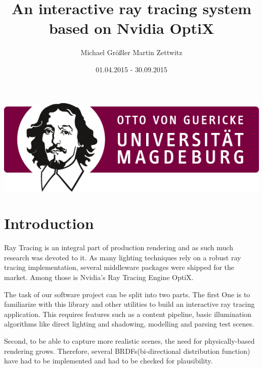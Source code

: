 \documentclass[11pt,a4paper]{article}
\begin{document}
	
\begin{titlepage}
\title{An interactive ray tracing system
\\based on Nvidia OptiX}
\date{01.04.2015 - 30.09.2015}
\author{Michael Größler	 Martin Zettwitz}
\maketitle

\begin{center}
\includegraphics[width=0.7\linewidth]{./OVGU}
\end{center}




\end{titlepage}

\tableofcontents


\newpage
\section{Introduction}
\label{sec:Introduction}
Ray Tracing is an integral part of production rendering and as such much research was devoted to it. As many lighting techniques rely on a robust ray tracing implementation, several middleware packages were shipped for the market. Among those is Nvidia's Ray Tracing Engine OptiX.

The task of our software project can be split into two parts. The first One is to familiarize with this library and other utilities to build an interactive ray tracing application. This requires features such as a content pipeline, basic illumination algorithms like direct lighting and shadowing, modelling and parsing test scenes.

Second, to be able to capture more realistic scenes, the need for physically-based rendering grows. Therefore, several BRDFs(bi-directional distribution function) have had to be implemented and had to be checked for plausibility.

\newpage
\end{document}
